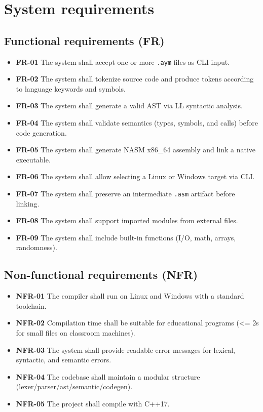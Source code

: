 \documentclass[11pt,a4paper]{article}
\begin{document}
\section{System requirements}

\subsection{Functional requirements (FR)}
\begin{itemize}
    \item \textbf{FR-01} The system shall accept one or more \texttt{.aym} files as CLI input.
    \item \textbf{FR-02} The system shall tokenize source code and produce tokens according to language keywords and symbols.
    \item \textbf{FR-03} The system shall generate a valid AST via LL syntactic analysis.
    \item \textbf{FR-04} The system shall validate semantics (types, symbols, and calls) before code generation.
    \item \textbf{FR-05} The system shall generate NASM x86\_64 assembly and link a native executable.
    \item \textbf{FR-06} The system shall allow selecting a Linux or Windows target via CLI.
    \item \textbf{FR-07} The system shall preserve an intermediate \texttt{.asm} artifact before linking.
    \item \textbf{FR-08} The system shall support imported modules from external files.
    \item \textbf{FR-09} The system shall include built-in functions (I/O, math, arrays, randomness).
\end{itemize}

\subsection{Non-functional requirements (NFR)}
\begin{itemize}
    \item \textbf{NFR-01} The compiler shall run on Linux and Windows with a standard toolchain.
    \item \textbf{NFR-02} Compilation time shall be suitable for educational programs (\textless= 2s for small files on classroom machines).
    \item \textbf{NFR-03} The system shall provide readable error messages for lexical, syntactic, and semantic errors.
    \item \textbf{NFR-04} The codebase shall maintain a modular structure (lexer/parser/ast/semantic/codegen).
    \item \textbf{NFR-05} The project shall compile with C++17.
\end{itemize}
\end{document}
